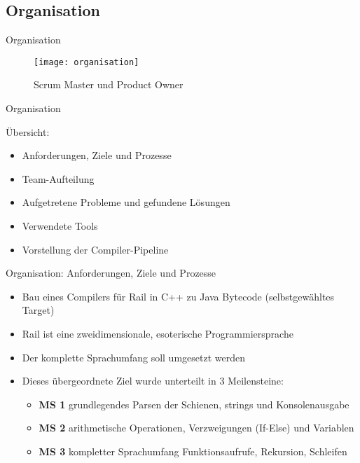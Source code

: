 \subsection{Organisation}

\begin{frame}{Organisation}

\begin{figure}
  \begin{center}
    \leavevmode
      \texttt{[image: organisation]}
    \caption{Scrum Master und Product Owner}
  \end{center}
\end{figure}

\end{frame}

\pagebreak

\begin{frame}{Organisation}

	\pause
	\"Ubersicht:
	\pause
	\begin{itemize}
		\item Anforderungen, Ziele und Prozesse
		\pause
		\item Team-Aufteilung 
		\pause
		\item Aufgetretene Probleme und gefundene L\"osungen
		\pause
		\item Verwendete Tools
		\pause
		\item Vorstellung der Compiler-Pipeline
	\end{itemize}

\end{frame}

\pagebreak

\begin{frame}{Organisation: Anforderungen, Ziele und Prozesse}

	\pause
	\begin{itemize}
		\item Bau eines Compilers f\"ur Rail in C++ zu Java Bytecode (selbstgew\"ahltes Target)
		\pause
		\item Rail ist eine zweidimensionale, esoterische Programmiersprache 
		\pause
		\item Der komplette Sprachumfang soll umgesetzt werden
		\pause
		\item Dieses \"ubergeordnete Ziel wurde unterteilt in 3 Meilensteine:
		\pause
		\begin{itemize}
			\item \textbf{\textcolor{fu-blue}{MS 1}}  grundlegendes Parsen der Schienen, strings und Konsolenausgabe
			\pause
			\item \textbf{\textcolor{fu-blue}{MS 2}}  arithmetische Operationen, Verzweigungen (If-Else) und Variablen
			\pause
			\item \textbf{\textcolor{fu-blue}{MS 3}}  kompletter Sprachumfang Funktionsaufrufe, Rekursion, Schleifen 
		\end{itemize}
	\end{itemize}

\end{frame}
	
